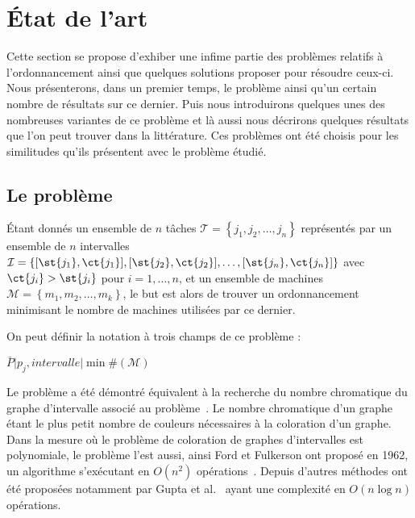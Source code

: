 \documentclass[a4paper,11pt]{report}
\begin{document}
\newpage
\chapter{État de l'art}


Cette section se propose d'exhiber une infime partie des problèmes relatifs à l'ordonnancement
ainsi que quelques solutions proposer pour résoudre ceux-ci. Nous présenterons, dans un premier
temps, le problème \bisched{} ainsi qu'un certain nombre de résultats sur ce dernier. Puis nous
introduirons quelques unes des nombreuses variantes de ce problème et là aussi nous décrirons
quelques résultats que l'on peut trouver dans la littérature. Ces problèmes ont été choisis pour les
similitudes qu'ils présentent avec le problème étudié.

\section{Le problème \bisched{}}

Étant donnés un ensemble de $n$ tâches $\mathcal{T} = \left\{
j_1, j_2, \dots, j_n \right\}$ représentés par un ensemble de $n$ intervalles $\mathcal{I} = \{
[ \st{j_1}, \ct{j_1} ], [ \st{j_2}, \ct{j_2} ], \dots, [ \st{j_n},
\ct{j_n} ] \}$ avec $\ct{j_i} > \st{j_i}$ pour $i = 1, \dots, n$, et un ensemble de
machines $\mathcal{M} = \left\{ m_1, m_2, \dots, m_k \right\}$, le but est alors de trouver un
ordonnancement minimisant le nombre de machines utilisées par ce dernier.

On peut définir la notation à trois champs de ce problème :
\begin{center}
    $\bar{P} \Big| p_j, intervalle \Big| \min \#(\mathcal{M})$
\end{center}

Le problème \bisched{} a été démontré équivalent à la recherche du nombre chromatique du graphe d'intervalle
associé au problème~\cite{golumbicalgorithmic}. Le nombre chromatique d'un graphe étant le plus
petit nombre de couleurs nécessaires à la coloration d'un graphe. Dans la mesure où le problème de
coloration de graphes d'intervalles est polynomiale, le problème \bisched{} l'est aussi, ainsi Ford et
Fulkerson ont proposé en 1962, un algorithme s'exécutant en $O(n^2)$
opérations~\cite{ford1962network}. Depuis d'autres méthodes ont été proposées notamment par Gupta et
al.~\cite{gupta_optimal_1978} ayant une complexité en $O(n\log n)$ opérations.
\end{document}
